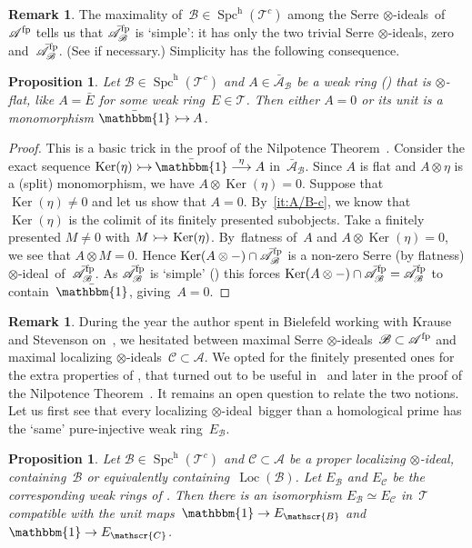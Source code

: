\documentclass[JEP,XML,SOM,Unicode]{cedram}
\makeatletter
\def\To#1{\mathchoice{\xrightarrow{\textstyle\kern4pt#1\kern3pt}}{\stackrel{#1}{\longrightarrow}}{}{}}
\newcommand{\into}{\mathchoice{\xymatrix@=.5cm{\ar@{>->}[r]&}}
{\xymatrix@=.3cm{\ar@{>->}[r]&}\hspace*{-1mm}}
{\hspace*{-1mm}\xymatrix@=.25cm{\ar@{>->}[r]&}\hspace*{-1.5mm}}
{\xymatrix@=.1cm{\ar@{>->}[r]&}\hspace*{-1mm}}
}
\numberwithin{equation}{section}
\newtheorem{Prop}[equation]{Proposition}
\theoremstyle{definition}
\newtheorem{Rem}[equation]{Remark}
\DeclareMathOperator{\Ker}{Ker}
\DeclareMathOperator{\Spc}{Spc}
\newcommand{\cat}[1]{\mathscr{#1}}
\let\xto\To
\newcommand{\unit}{\mathbbm{1}}
\DeclareMathOperator{\Loc}{Loc}
\newcommand{\smallh}{\mathrm{h}}
\newcommand{\AB}{\bar{\cA}_{\cB}}
\newcommand{\bunit}{\bar\unit}
\newcommand{\cA}{\cat{A}}
\newcommand{\cB}{\cat{B}}
\newcommand{\cC}{\cat{C}}
\newcommand{\cT}{\cat{T}}
\newcommand{\EB}{E_{\cB}}
\newcommand{\EC}{E_{\cC}}
\newcommand{\fp}{^{\textup{fp}}}
\newcommand{\SpchT}{\Spch(\cat{T}^c)}
\newcommand{\Spch}{\Spc^{\smallh}}
\newcommand{\tensids}{$\otimes$\nobreakdash-ideals}
\newcommand{\tensid}{$\otimes$\nobreakdash-ideal}
\makeatother
\begin{document}
\begin{Rem}
\label{Rem:simple}
The maximality of~$\cB\in\SpchT$ among the Serre \tensids\ of~$\cA\fp$ tells us that $\AB\fp$ is `simple': it has only the two trivial Serre \tensids, zero and~$\AB\fp$. (See  if necessary.) Simplicity has the following consequence.
\end{Rem}

\begin{Prop}
\label{Prop:ring-in-AB}
Let $\cB\in\SpchT$ and $A\in\AB$ be a weak ring () that is $\otimes$-flat, like $A=\bar E$ for some weak ring~$E\in\cT$. Then either $A=0$ or its unit is a monomorphism $\bunit\into A$.
\end{Prop}

\begin{proof}
This is a basic trick in the proof of the Nilpotence Theorem~\cite{Balmer20a}. Consider the exact sequence $\Ker(\eta)\into \bunit\xto{\eta} A$ in~$\AB$. Since $A$ is flat and $A\otimes\eta$ is a (split) monomorphism, we have $A\otimes\Ker(\eta)=0$. Suppose that $\Ker(\eta)\neq0$ and let us show that $A=0$. By \,\eqref{it:A/B-c}, we know that $\Ker(\eta)$ is the colimit of its finitely presented subobjects. Take a finitely presented $M\neq0$ with $M\into \Ker(\eta)$. By~flatness of~$A$ and $A\otimes\Ker(\eta)=0$, we see that $A\otimes M=0$. Hence $\Ker(A\otimes-)\cap \AB\fp$ is a non-zero Serre (by flatness) \tensid\ of~$\AB\fp$. As $\AB\fp$ is `simple' () this forces $\Ker(A\otimes-)\cap \AB\fp=\AB\fp$ to contain~$\bunit$, giving~$A=0$.
\end{proof}

\begin{Rem}
\label{Rem:max-vs-max}
During the year the author spent in Bielefeld working with Krause and Stevenson on~\cite{BalmerKrauseStevenson19}, we hesitated between maximal Serre \tensids\ $\cB\subset\cA\fp$ and maximal localizing \tensids\ $\cC\subset\cA$. We opted for the finitely presented ones for the extra properties of , that turned out to be useful in~\cite{BalmerKrauseStevenson19} and later in the proof of the Nilpotence Theorem~\cite{Balmer20a}. It remains an open question to relate the two notions. Let us first see that every localizing \tensid\ bigger than a homological prime has the `same' pure-injective weak ring~$\EB$.
\end{Rem}

\begin{Prop}
\label{Prop:EB=EC}
Let $\cB\in\SpchT$ and $\cC\subset\cA$ be a proper localizing \tensid, containing~$\cB$ or equivalently containing~$\Loc(\cB)$. Let $\EB$ and $\EC$ be the corresponding weak rings of . Then there is an isomorphism $\EB\simeq \EC$ in~$\cT$ compatible with the unit maps~$\unit\to\EB$ and~$\unit\to \EC$.
\end{Prop}
\end{document}

